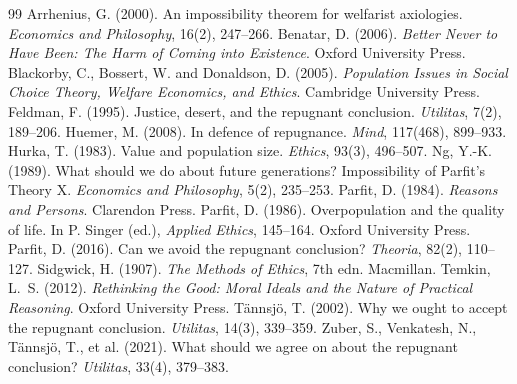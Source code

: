 \documentclass{situationist-preprint}
\begin{document}
\begin{thebibliography}{99}\small
{} Arrhenius, G. (2000). An impossibility theorem for welfarist axiologies. \emph{Economics and Philosophy}, 16(2), 247--266.
 Benatar, D. (2006). \emph{Better Never to Have Been: The Harm of Coming into Existence}. Oxford University Press.
 Blackorby, C., Bossert, W. and Donaldson, D. (2005). \emph{Population Issues in Social Choice Theory, Welfare Economics, and Ethics}. Cambridge University Press.
 Feldman, F. (1995). Justice, desert, and the repugnant conclusion. \emph{Utilitas}, 7(2), 189--206.
 Huemer, M. (2008). In defence of repugnance. \emph{Mind}, 117(468), 899--933.
 Hurka, T. (1983). Value and population size. \emph{Ethics}, 93(3), 496--507.
 Ng, Y.-K. (1989). What should we do about future generations? Impossibility of Parfit's Theory X. \emph{Economics and Philosophy}, 5(2), 235--253.
 Parfit, D. (1984). \emph{Reasons and Persons}. Clarendon Press.
 Parfit, D. (1986). Overpopulation and the quality of life. In P. Singer (ed.), \emph{Applied Ethics}, 145--164. Oxford University Press.
 Parfit, D. (2016). Can we avoid the repugnant conclusion? \emph{Theoria}, 82(2), 110--127.
 Sidgwick, H. (1907). \emph{The Methods of Ethics}, 7th edn. Macmillan.
 Temkin, L.~S. (2012). \emph{Rethinking the Good: Moral Ideals and the Nature of Practical Reasoning}. Oxford University Press.
 T{\"a}nnsj{\"o}, T. (2002). Why we ought to accept the repugnant conclusion. \emph{Utilitas}, 14(3), 339--359.
 Zuber, S., Venkatesh, N., T{\"a}nnsj{\"o}, T., et al. (2021). What should we agree on about the repugnant conclusion? \emph{Utilitas}, 33(4), 379--383.
\end{thebibliography}
\end{document}
